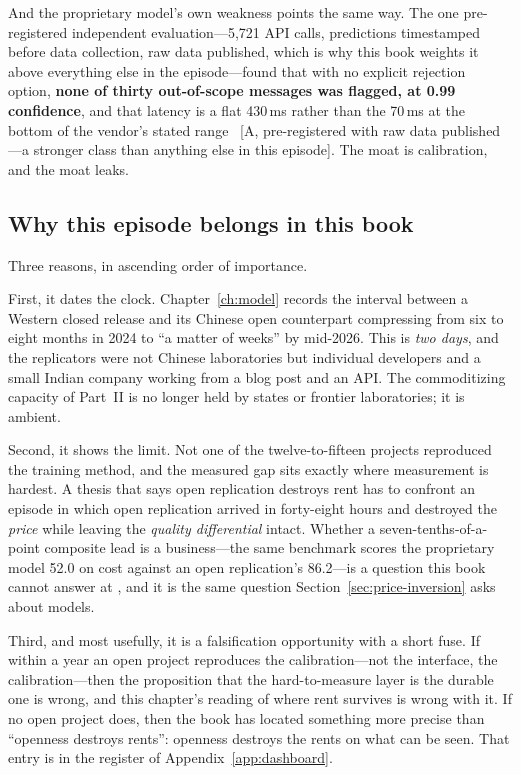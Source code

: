 And the proprietary model's own weakness points the same way. The one pre-registered independent evaluation---5,721 API calls, predictions timestamped before data collection, raw data published, which is why this book weights it above everything else in the episode---found that with no explicit rejection option, \textbf{none of thirty out-of-scope messages was flagged, at 0.99 confidence}, and that latency is a flat 430\,ms rather than the 70\,ms at the bottom of the vendor's stated range~\cite{jev-priorbench} [A, pre-registered with raw data published---a stronger class than anything else in this episode]. The moat is calibration, and the moat leaks.

\subsection{Why this episode belongs in this book}

Three reasons, in ascending order of importance.

First, it dates the clock. Chapter~\ref{ch:model} records the interval between a Western closed release and its Chinese open counterpart compressing from six to eight months in 2024 to ``a matter of weeks'' by mid-2026. This is \emph{two days}, and the replicators were not Chinese laboratories but individual developers and a small Indian company working from a blog post and an API. The commoditizing capacity of Part~II is no longer held by states or frontier laboratories; it is ambient.

Second, it shows the limit. Not one of the twelve-to-fifteen projects reproduced the training method, and the measured gap sits exactly where measurement is hardest. A thesis that says open replication destroys rent has to confront an episode in which open replication arrived in forty-eight hours and destroyed the \emph{price} while leaving the \emph{quality differential} intact. Whether a seven-tenths-of-a-point composite lead is a business---the same benchmark scores the proprietary model 52.0 on cost against an open replication's 86.2---is a question this book cannot answer at \datafreeze, and it is the same question Section~\ref{sec:price-inversion} asks about models.

Third, and most usefully, it is a falsification opportunity with a short fuse. If within a year an open project reproduces the calibration---not the interface, the calibration---then the proposition that the hard-to-measure layer is the durable one is wrong, and this chapter's reading of where rent survives is wrong with it. If no open project does, then the book has located something more precise than ``openness destroys rents'': openness destroys the rents on what can be seen. That entry is in the register of Appendix~\ref{app:dashboard}.

